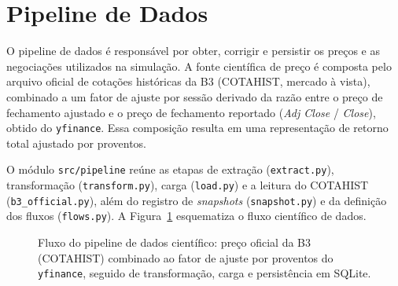 \section{Pipeline de Dados}

O pipeline de dados é responsável por obter, corrigir e persistir os preços e as negociações utilizados na simulação. A fonte científica de preço é composta pelo arquivo oficial de cotações históricas da B3 (COTAHIST, mercado à vista), combinado a um fator de ajuste por sessão derivado da razão entre o preço de fechamento ajustado e o preço de fechamento reportado (\textit{Adj Close} / \textit{Close}), obtido do \texttt{yfinance}. Essa composição resulta em uma representação de retorno total ajustado por proventos.

O módulo \texttt{src/pipeline} reúne as etapas de extração (\texttt{extract.py}), transformação (\texttt{transform.py}), carga (\texttt{load.py}) e a leitura do COTAHIST (\texttt{b3\_official.py}), além do registro de \textit{snapshots} (\texttt{snapshot.py}) e da definição dos fluxos (\texttt{flows.py}). A Figura~\ref{fig:pipeline} esquematiza o fluxo científico de dados.

\begin{figure}[htbp]
\centering
{}
\caption{Fluxo do pipeline de dados científico: preço oficial da B3 (COTAHIST) combinado ao fator de ajuste por proventos do \texttt{yfinance}, seguido de transformação, carga e persistência em SQLite.}
\label{fig:pipeline}
\end{figure}

